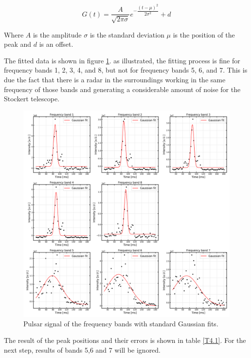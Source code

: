 \documentclass[12pt]{article}
\begin{document}
\begin{equation}
G(t) = \dfrac{A}{\sqrt{2\pi \sigma}} e^{-\dfrac{(t-\mu)^2}{2\sigma^2}} +d
\label{eq4.6} 
\end{equation}

Where $A$ is the amplitude $\sigma$ is the standard deviation $\mu$ is the position of the peak and $d$ is an offset.

The fitted data is shown in figure \ref{fig5.2}. as illustrated, the fitting process is fine for frequency bands 1, 2, 3, 4, and 8, but not for frequency bands 5, 6, and 7. This is due the fact that there is a  radar in the surroundings working in the same frequency of those bands and generating a considerable amount of noise for the Stockert telescope.

\begin{figure}[H]
\centering
\includegraphics[width=\textwidth]{fig/Gaussian_good_fits_pulsar.png}
\caption{Pulsar signal of the frequency bands with standard Gaussian fits.}
\label{fig5.2}
\end{figure} 

The result of the peak positions and their errors is shown in table \ref{T4.1}. For the next step, results of bands 5,6 and 7 will be ignored.
\end{document}
